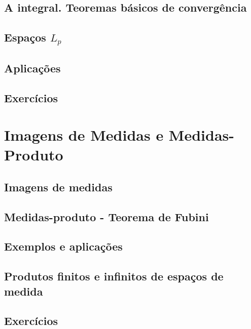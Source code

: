 \documentclass[
]{book}
\begin{document}
\section{A integral. Teoremas básicos de convergência}\label{a-integral.-teoremas-buxe1sicos-de-converguxeancia}

\section{\texorpdfstring{Espaços \(L_p\)}{Espaços L\_p}}\label{espauxe7os-l_p}

\section{Aplicações}\label{aplicauxe7uxf5es}

\section*{Exercícios}\label{exercuxedcios-4}

\chapter{Imagens de Medidas e Medidas-Produto}\label{imagens-de-medidas-e-medidas-produto}

\section{Imagens de medidas}\label{imagens-de-medidas}

\section{Medidas-produto - Teorema de Fubini}\label{medidas-produto---teorema-de-fubini}

\section{Exemplos e aplicações}\label{exemplos-e-aplicauxe7uxf5es}

\section{Produtos finitos e infinitos de espaços de medida}\label{produtos-finitos-e-infinitos-de-espauxe7os-de-medida}

\section*{Exercícios}\label{exercuxedcios-5}
\end{document}
